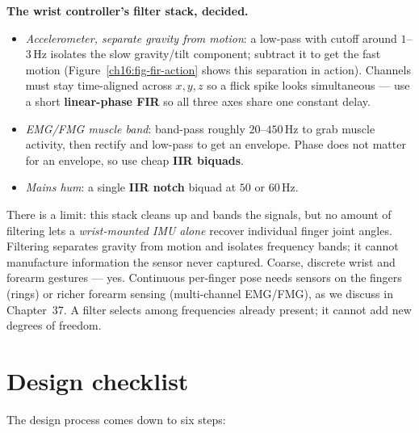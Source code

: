 \begin{goalbox}
\textbf{The wrist controller's filter stack, decided.}
\begin{itemize}
\item \emph{Accelerometer, separate gravity from motion}: a low-pass with cutoff
around $1$--$3$\,Hz isolates the slow gravity/tilt component; subtract it to get
the fast motion (Figure~\ref{ch16:fig-fir-action} shows this separation in
action). Channels must stay time-aligned across $x,y,z$ so a flick spike
looks simultaneous --- use a short \textbf{linear-phase FIR} so all three axes
share one constant delay.
\item \emph{EMG/FMG muscle band}: band-pass roughly $20$--$450$\,Hz to grab muscle
activity, then rectify and low-pass to get an envelope. Phase does not matter for
an envelope, so use cheap \textbf{IIR biquads}.
\item \emph{Mains hum}: a single \textbf{IIR notch} biquad at $50$ or $60$\,Hz.
\end{itemize}
There is a limit: this stack cleans up and bands the signals,
but no amount of filtering lets a \emph{wrist-mounted IMU alone} recover individual
finger joint angles. Filtering separates gravity from motion and isolates frequency
bands; it cannot manufacture information the sensor never captured. Coarse,
discrete wrist and forearm gestures --- yes. Continuous per-finger pose needs
sensors on the fingers (rings) or richer forearm sensing (multi-channel EMG/FMG),
as we discuss in Chapter~37. A filter selects among frequencies already present;
it cannot add new degrees of freedom.
\end{goalbox}

\section{Design checklist}
\label{ch16:checklist}

The design process comes down to six steps:

